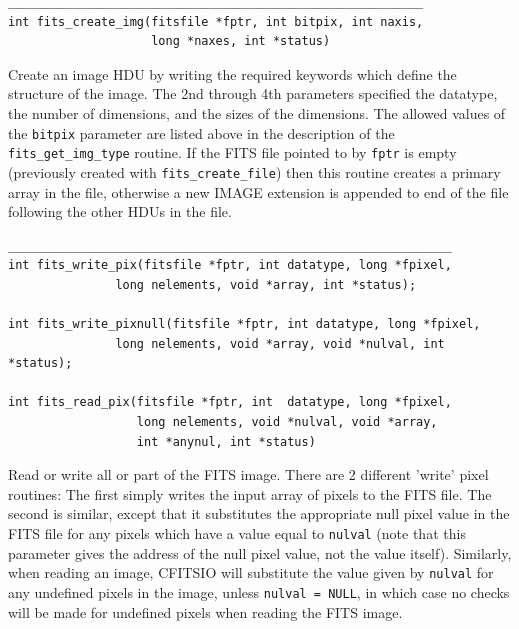 \documentclass[11pt]{article}
\begin{document}
\begin{verbatim}
__________________________________________________________
int fits_create_img(fitsfile *fptr, int bitpix, int naxis,
                    long *naxes, int *status)
\end{verbatim}

Create an image HDU by writing the required keywords which define the
structure of the image.  The 2nd through 4th parameters  specified the
datatype, the number of dimensions, and the sizes of the dimensions.
The allowed values of the {\tt bitpix} parameter are listed above in
the description of the {\tt fits\_get\_img\_type} routine.  If the FITS
file pointed to by {\tt fptr} is empty (previously created with
{\tt fits\_create\_file}) then this routine creates a primary array in
the file, otherwise a new IMAGE extension is appended to end of the
file following the other HDUs in the file.

\begin{verbatim}
______________________________________________________________
int fits_write_pix(fitsfile *fptr, int datatype, long *fpixel,
               long nelements, void *array, int *status);

int fits_write_pixnull(fitsfile *fptr, int datatype, long *fpixel,
               long nelements, void *array, void *nulval, int *status);

int fits_read_pix(fitsfile *fptr, int  datatype, long *fpixel,
                  long nelements, void *nulval, void *array,
                  int *anynul, int *status)
\end{verbatim}

Read or write all or part of the FITS image.  There are 2 different
'write' pixel routines:  The first simply writes the input array of pixels
to the FITS file.  The second is similar, except that it substitutes
the appropriate null pixel value in the FITS file for any pixels
which have a value equal to {\tt *nulval} (note that this parameter
gives the address of the null pixel value, not the value itself).
Similarly,  when reading an image, CFITSIO will substitute the value
given by {\tt nulval}  for  any undefined pixels in the image, unless
{\tt nulval = NULL}, in which case no checks will be made for undefined
pixels when reading the FITS image.
\end{document}
